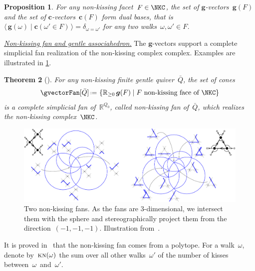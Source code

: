 \documentclass{amsart}
\newtheorem{theorem}{Theorem}[section]
\newtheorem{proposition}[theorem]{Proposition}
\theoremstyle{definition}
\newcommand{\R}{\mathbb{R}} %
\renewcommand{\b}[1]{{\boldsymbol{#1}}} %
\newcommand{\set}[2]{\left\{ #1 \;\middle|\; #2 \right\}} %
\newcommand{\bigdotprod}[2]{\big\langle \, #1 \; \big| \; #2 \, \big\rangle} %
\newcommand{\eqdef}{\mbox{\,\raisebox{0.2ex}{\scriptsize\ensuremath{\mathrm:}}\ensuremath{=}\,}} %
\newcommand{\darkblue}{\color{darkblue}} %
\newcommand{\defn}[1]{\textsl{\darkblue #1}} %
\newcommand{\para}[1]{\medskip\noindent\uline{\textit{#1.}}} %
\newcommand{\gvector}[1]{\b{g}(#1)} %
\newcommand{\gvectors}[1]{\b{g}(#1)} %
\newcommand{\cvector}[2]{\mathbf{c}(#2 \in #1)} %
\newcommand{\cvectors}[1]{\mathbf{c}(#1)} %
\newcommand{\quiver}{\bar Q} %
\newcommand{\KN}{\textsc{kn}} %
\begin{document}
\begin{proposition}
\label{prop:gvectorscvectorsDualBasesGentle}
For any non-kissing facet~$F \in \NKC$, the set of $\b{g}$-vectors~$\gvectors{F}$ and the set of $\b{c}$-vectors~$\cvectors{F}$ form dual bases, that is
\(
{\bigdotprod{\gvector{\omega}}{\cvector{F}{\omega'}} = \delta_{\omega=\omega'}}
\)
for any two walks~$\omega, \omega' \in F$.
\end{proposition}

\para{Non-kissing fan and gentle associahedron}
%
\enlargethispage{.2cm}
The $\b{g}$-vectors support a complete simplicial fan realization of the non-kissing complex complex.
Examples are illustrated in \cref{fig:nonkissingFans}.

\begin{theorem}[{\cite[Thm.~4.17]{PaluPilaudPlamondon-nonkissing}}]
\label{thm:nonkissingFan}
For any non-kissing finite gentle quiver~$\quiver$, the set of cones
\[
\gvectorFan[\quiver] \eqdef \set{\R_{\ge 0} \, \gvectors{F}}{F \text{ non-kissing face of } \NKC}
\]
is a complete simplicial fan of~$\R^{Q_0}$, called \defn{non-kissing fan} of~$\quiver$, which realizes the non-kissing complex~$\NKC$.
\end{theorem}

\begin{figure}[b]
	\capstart
	\centerline{\includegraphics[scale=.45]{nonkissingFans}}
	\caption{Two non-kissing fans. As the fans are $3$-dimensional, we intersect them with the sphere and stereographically project them from the direction~$(-1,-1,-1)$. Illustration from~\cite{PaluPilaudPlamondon-nonkissing}.}
	\label{fig:nonkissingFans}
\end{figure}

It is proved in~\cite[Thm.~4.27]{PaluPilaudPlamondon-nonkissing} that the non-kissing fan comes from a polytope.
For a walk~$\omega$, denote by~$\KN(\omega)$ the sum over all other walks~$\omega'$ of the number of kisses between~$\omega$~and~$\omega'$.
\end{document}
